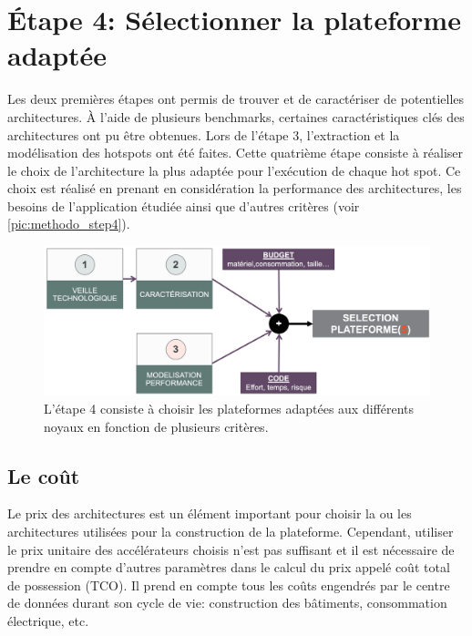 \section{Étape 4: Sélectionner la plateforme adaptée} \label{sec:methodo_step4}


    Les deux premières étapes ont permis de trouver et de caractériser de potentielles architectures. À l'aide de plusieurs benchmarks, certaines caractéristiques clés des architectures ont pu être obtenues. Lors de l'étape 3, l'extraction et la modélisation des \glspl{hotspot} ont été faites.  Cette quatrième étape consiste à réaliser le choix de l'architecture la plus adaptée pour l'exécution de chaque hot spot. Ce choix est réalisé en prenant en considération la performance des architectures, les besoins de l'application étudiée ainsi que d'autres critères (voir \autoref{pic:methodo_step4}).
    
    \begin{figure}
        \center
        \includegraphics[width=14cm]{images/methodo_step4.png}
        \caption{\label{pic:methodo_step4}L'étape 4 consiste à choisir les plateformes adaptées aux différents noyaux en fonction de plusieurs critères.}
    \end{figure}



\subsection{Le coût}
    
   Le prix des architectures est un élément important pour choisir la ou les architectures utilisées pour la construction de la plateforme. Cependant, utiliser le prix unitaire des accélérateurs choisis n'est pas suffisant et il est nécessaire de prendre en compte d'autres paramètres dans le calcul du prix appelé coût total de possession (TCO). Il prend en compte tous les coûts engendrés par le centre de données durant son cycle de vie: construction des bâtiments, consommation électrique, etc.
    
